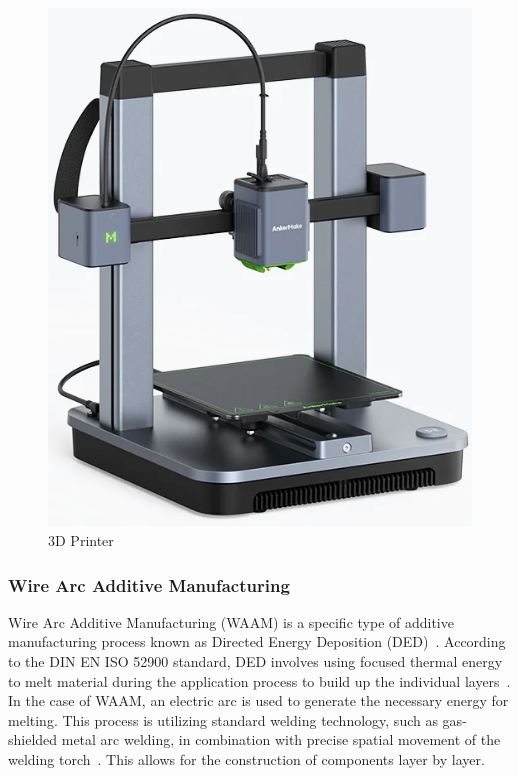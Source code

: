 \begin{figure}[H]
	\centerline{\includegraphics[scale=.5]{figures/3Dprinter.png}}
	\caption{3D Printer \cite{3D}}
	\label{3D}
\end{figure}

\subsubsection{Wire Arc Additive Manufacturing}
Wire Arc Additive Manufacturing (WAAM) is a specific type of additive manufacturing process known as Directed Energy Deposition (DED)~\cite{Svetlizky.2021}. According to the DIN EN ISO 52900 standard, DED involves using focused thermal energy to melt material during the application process to build up the individual layers~\cite{Additive}. In the case of WAAM, an electric arc is used to generate the necessary energy for melting. This process is utilizing standard welding technology, such as gas-shielded metal arc welding, in combination with precise spatial movement of the welding torch~\cite{Cunningham.2018}. This allows for the construction of components layer by layer.

